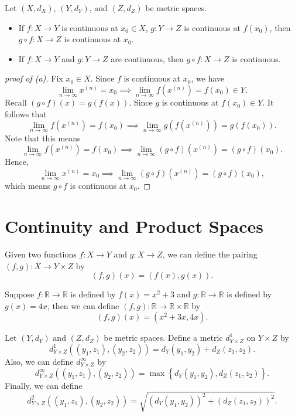 \begin{corollary}
    Let \((X, d_X)\), \((Y, d_Y)\), and \((Z, d_Z)\) be metric spaces. 
    \begin{itemize}
        \item [(a)] If \(f:X \to Y\) is continuous at \(x_0 \in X\), \(g: Y \to Z\) is continuous at \(f(x_0)\), then \(g \circ f: X \to Z\) is continuous at \(x_0\).   
        \item [(b)] If \(f:X \to Y\) and \(g:Y \to Z\) are continuous, then \(g \circ f:  X \to Z\) is continuous.   
    \end{itemize}   
\end{corollary}
\begin{proof}[proof of (a)]
    Fix \(x_0 \in X\). Since \(f\) is continuous at \(x_0\), we have 
    \[
        \lim_{n \to \infty} x^{(n)} = x_0 \implies \lim_{n \to \infty} f \left( x^{(n)} \right) = f(x_0) \in Y.   
    \]  
    Recall \( \left( g \circ f  \right) (x) = g(f(x))\). Since \(g\) is continuous at \(f(x_0) \in Y\). It follows that 
    \[
        \lim_{n \to \infty} f \left( x^{(n)} \right) = f(x_0) \implies \lim_{n \to \infty} g \left( f \left( x^{(n)} \right)  \right) = g(f(x_0)).   
    \]  Note that this means 
    \[
        \lim_{n \to \infty} f \left( x^{(n)} \right) = f(x_0) \implies \lim_{n \to \infty} \left( g \circ f \right)\left( x^{(n)} \right) = (g \circ f) (x_0).     
    \] 
    Hence, 
    \[
        \lim_{n \to \infty} x^{(n)} = x_0 \implies \lim_{n \to \infty} \left( g \circ f \right)\left( x^{(n)} \right) = (g \circ f) (x_0), 
    \] which means \(g \circ f\) is continuous at \(x_0\).   
\end{proof}

\section{Continuity and Product Spaces}
Given two functions \(f: X \to Y\) and \(g: X \to Z\), we can define the pairing \((f, g): X \to Y \times Z\) by 
\[
    (f, g)(x) = (f(x), g(x)).
\]   

\begin{eg}
    Suppose \(f:\mathbb{R} \to \mathbb{R} \) is defined by \(f(x) = x^2 + 3\) and \(g: \mathbb{R} \to \mathbb{R} \) is defined by \(g(x) = 4x\), then we can define \((f, g): \mathbb{R} \to \mathbb{R} \times \mathbb{R} \) by 
    \[
        (f, g)(x) = (x^2 + 3x, 4x).
    \]  
\end{eg}

\begin{definition} \label{def: product metric}
   Let \((Y, d_Y)\) and \((Z, d_Z)\) be metric spaces. Define a metric \(d_{Y \times Z}^1\) on \(Y \times Z\) by 
   \[
    d_{Y\times Z}^1 \left( (y_1, z_1), (y_2, z_2) \right) = d_Y(y_1, y_2) + d_Z(z_1, z_2). 
   \] Also, we can define \(d_{Y \times Z}^{\infty} \) by 
   \[
    d_{Y \times Z}^{\infty} \left( (y_1, z_1), (y_2, z_2) \right) = \max \left\{ d_Y (y_1, y_2), d_Z(z_1, z_2) \right\}.  
   \] Finally, we can define 
   \[
    d_{Y \times Z}^2 \left( (y_1, z_1), (y_2, z_2) \right) = \sqrt{\left( d_Y (y_1, y_2) \right)^2 + \left( d_Z(z_1, z_2) \right)^2  }.  
   \]  
\end{definition}

